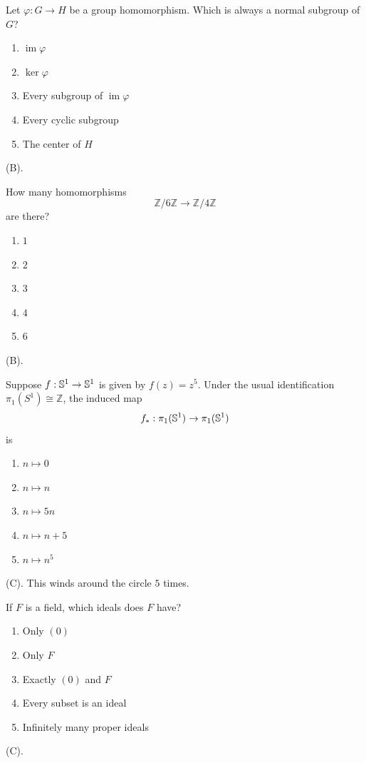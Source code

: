 \begin{exercise}
Let $\varphi:G\to H$ be a group homomorphism.
Which is always a normal subgroup of $G$?
\begin{enumerate}[label=(\Alph*)]
    \item $\operatorname{im}\varphi$
    \item $\ker\varphi$
    \item Every subgroup of $\operatorname{im}\varphi$
    \item Every cyclic subgroup
    \item The center of $H$
\end{enumerate}
\end{exercise}
\begin{solution}
(B).
\end{solution}

\begin{exercise}
How many homomorphisms
\[
\mathbb{Z}/6\mathbb{Z}\longrightarrow\mathbb{Z}/4\mathbb{Z}
\]
are there?
\begin{enumerate}[label=(\Alph*)]
    \item $1$
    \item $2$
    \item $3$
    \item $4$
    \item $6$
\end{enumerate}
\end{exercise}
\begin{solution}
(B).
\end{solution}

\begin{exercise}
Suppose $f:\S^1\to \S^1$ is given by $f(z)=z^5$.
Under the usual identification $\pi_1(S^1)\cong\mathbb{Z}$, the induced map
\[
f_*:\pi_1(\S^1)\to\pi_1(\S^1)
\]
is
\begin{enumerate}[label=(\Alph*)]
    \item $n\mapsto 0$
    \item $n\mapsto n$
    \item $n\mapsto 5n$
    \item $n\mapsto n+5$
    \item $n\mapsto n^5$
\end{enumerate}
\end{exercise}
\begin{solution}
(C). This winds around the circle $5$ times.
\end{solution}

\begin{exercise}
If $F$ is a field, which ideals does $F$ have?

\begin{enumerate}[label=(\Alph*)]
    \item Only $(0)$
    \item Only $F$
    \item Exactly $(0)$ and $F$
    \item Every subset is an ideal
    \item Infinitely many proper ideals
\end{enumerate}
\end{exercise}
\begin{solution}
(C).
\end{solution}

